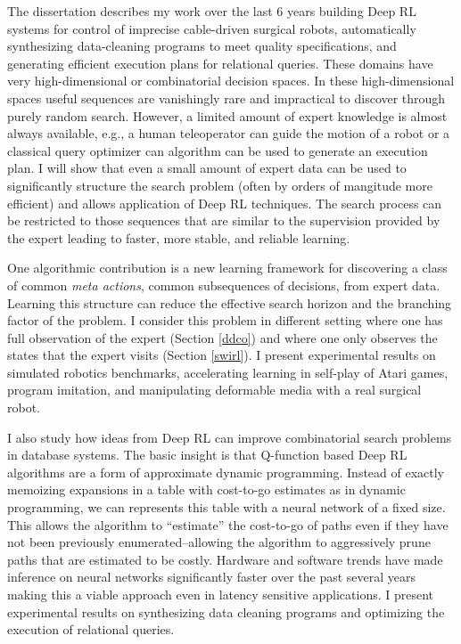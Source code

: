 The dissertation describes my work over the last 6 years building Deep RL systems for control of imprecise cable-driven surgical robots, automatically synthesizing data-cleaning programs to meet quality specifications, and generating efficient execution plans for relational queries. 
These domains have very high-dimensional or combinatorial decision spaces. In these high-dimensional spaces useful sequences are vanishingly rare and impractical to discover through purely random search.
However, a limited amount of expert knowledge is almost always available, e.g., a human teleoperator can guide the motion of a robot or a classical query optimizer can algorithm can be used to generate an execution plan. 
I will show that even a small amount of expert data can be used to significantly structure the search problem (often by orders of mangitude more efficient) and allows application of Deep RL techniques.
The search process can be restricted to those sequences that are similar to the supervision provided by the expert leading to faster, more stable, and reliable learning.

One algorithmic contribution is a new learning framework for discovering a class of common \emph{meta actions}, common subsequences of decisions, from expert data. Learning this structure can reduce the effective search horizon and the branching factor of the problem. I consider this problem in different setting where one has full observation of the expert (Section \ref{ddco}) and where one only observes the states that the expert visits (Section \ref{swirl}). I present experimental results on simulated robotics benchmarks, accelerating learning in self-play of Atari games, program imitation, and manipulating deformable media with a real surgical robot.

I also study how ideas from Deep RL can improve combinatorial search problems in database systems.
The basic insight is that Q-function based Deep RL algorithms are a form of approximate dynamic programming.
Instead of exactly memoizing expansions in a table with cost-to-go estimates as in dynamic programming, we can represents this table with a neural network of a fixed size.
This allows the algorithm to ``estimate'' the cost-to-go of paths even if they have not been previously enumerated--allowing the algorithm to aggressively prune paths that are estimated to be costly.
Hardware and software trends have made inference on neural networks significantly faster over the past several years making this a viable approach even in latency sensitive applications.
I present experimental results on synthesizing data cleaning programs and optimizing the execution of relational queries.




